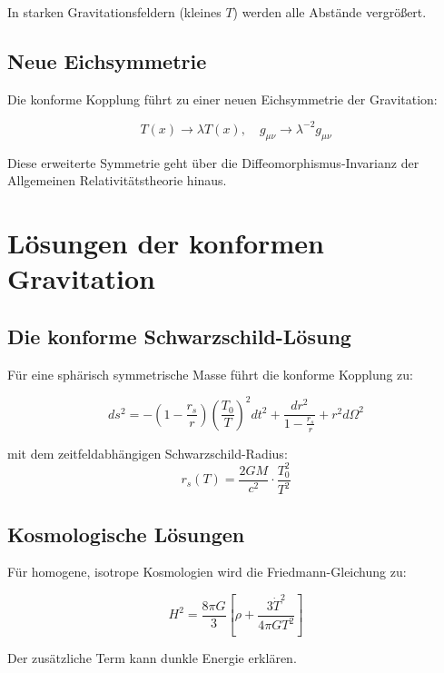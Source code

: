 \documentclass[12pt,a4paper]{report}
\begin{document}
	In starken Gravitationsfeldern (kleines $T$) werden alle Abstände vergrößert.
	
	\subsection{Neue Eichsymmetrie}
	
	Die konforme Kopplung führt zu einer neuen Eichsymmetrie der Gravitation:
	
	\begin{equation}
		T(x) \to \lambda T(x), \quad g_{\mu\nu} \to \lambda^{-2} g_{\mu\nu}
	\end{equation}
	
	Diese erweiterte Symmetrie geht über die Diffeomorphismus-Invarianz der Allgemeinen Relativitätstheorie hinaus.
	
	\section{Lösungen der konformen Gravitation}
	
	\subsection{Die konforme Schwarzschild-Lösung}
	
	Für eine sphärisch symmetrische Masse führt die konforme Kopplung zu:
	
	\begin{equation}
		ds^2 = -\left(1-\frac{r_s}{r}\right)\left(\frac{T_0}{T}\right)^2 dt^2 + \frac{dr^2}{1-\frac{r_s}{r}} + r^2d\Omega^2
	\end{equation}
	
	mit dem zeitfeldabhängigen Schwarzschild-Radius:
	\begin{equation}
		r_s(T) = \frac{2GM}{c^2} \cdot \frac{T_0^2}{T^2}
	\end{equation}
	
	\subsection{Kosmologische Lösungen}
	
	Für homogene, isotrope Kosmologien wird die Friedmann-Gleichung zu:
	
	\begin{equation}
		H^2 = \frac{8\pi G}{3}\left[\rho + \frac{3\dot{T}^2}{4\pi G T^2}\right]
	\end{equation}
	
	Der zusätzliche Term kann dunkle Energie erklären.
	
\end{document}
